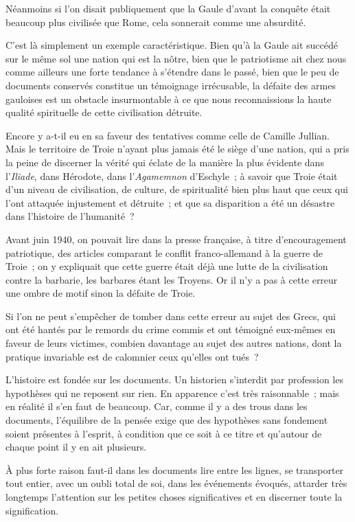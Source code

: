 \documentclass[french,twoside]{book} %
\begin{document}
Néanmoins si l'on disait publiquement que la Gaule d'avant la conquête était beaucoup plus civilisée que Rome, cela sonnerait comme une absurdité.\par
C'est là simplement un exemple caractéristique. Bien qu'à la Gaule ait succédé sur le même sol une nation qui est la nôtre, bien que le patriotisme ait chez nous comme ailleurs une forte tendance à s'étendre dans le passé, bien que le peu de documents conservés constitue un témoignage irrécusable, la défaite des armes gauloises est un obstacle insurmontable à ce que nous reconnaissions la haute qualité spirituelle de cette civilisation détruite.\par
Encore y a-t-il eu en sa faveur des tentatives comme celle de Camille Jullian. Mais le territoire de Troie n'ayant plus jamais été le siège d'une nation, qui a pris la peine de discerner la vérité qui éclate de la manière la plus évidente dans l'{\itshape Iliade}, dans Hérodote, dans l'{\itshape Agamemnon} d'Eschyle ; à savoir que Troie était d'un niveau de civilisation, de culture, de spiritualité bien plus haut que ceux qui l'ont attaquée injustement et détruite ; et que sa disparition a été un désastre dans l'histoire de l'humanité ?\par
Avant juin 1940, on pouvait lire dans la presse française, à titre d'encouragement patriotique, des articles comparant le conflit franco-allemand à la guerre de Troie ; on y expliquait que cette guerre était déjà une lutte de la civilisation contre la barbarie, les barbares étant les Troyens. Or il n'y a pas à cette erreur une ombre de motif sinon la défaite de Troie.\par
Si l'on ne peut s'empêcher de tomber dans cette erreur au sujet des Grecs, qui ont été hantés par le remords du crime commis et ont témoigné eux-mêmes en faveur de leurs victimes, combien davantage au sujet des autres nations, dont la pratique invariable est de calomnier ceux qu'elles ont tués ?\par
L'histoire est fondée sur les documents. Un historien s'interdit par profession les hypothèses qui ne reposent sur rien. En apparence c'est très raisonnable ; mais en réalité il s'en faut de beaucoup. Car, comme il y a des trous dans les documents, l'équilibre de la pensée exige que des hypothèses sans fondement soient présentes à l'esprit, à condition que ce soit à ce titre et qu'autour de chaque point il y en ait plusieurs.\par
À plus forte raison faut-il dans les documents lire entre les lignes, se transporter tout entier, avec un oubli total de soi, dans les événements évoqués, attarder très longtemps l'attention sur les petites choses significatives et en discerner toute la signification.\par
\end{document}
